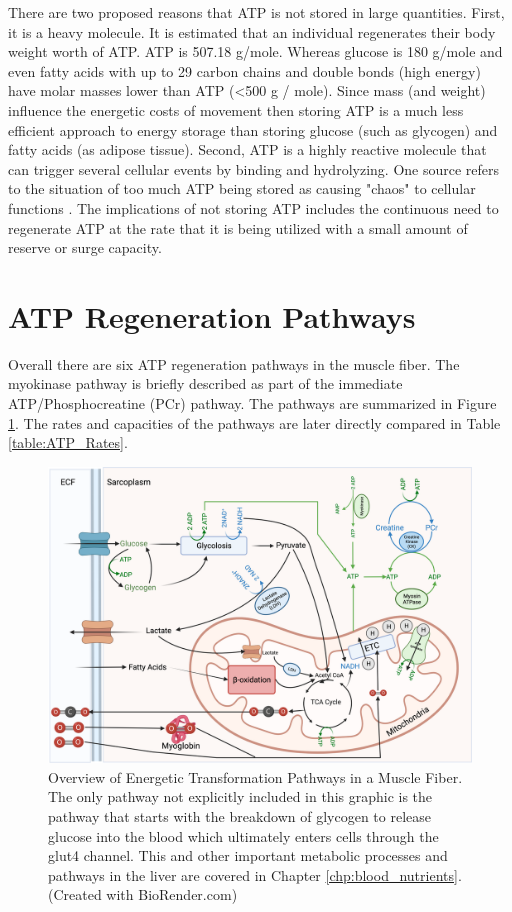 There are two proposed reasons that ATP is not stored in large quantities. First, it is a heavy molecule. It is estimated that an individual regenerates their body weight worth of ATP. ATP is 507.18 g/mole. Whereas glucose is 180 g/mole and even fatty acids with up to 29 carbon chains and double bonds (high energy) have molar masses lower than ATP (<500 g / mole). Since mass (and weight) influence the energetic costs of movement then storing ATP is a much less efficient approach to energy storage than storing glucose (such as glycogen) and fatty acids (as adipose tissue). Second, ATP is a highly reactive molecule that can trigger several cellular events by binding and hydrolyzing. One source refers to the situation of too much ATP being stored as causing "chaos" to cellular functions \cite{jones_skeletal_2006}. The implications of not storing ATP includes the continuous need to regenerate ATP at the rate that it is being utilized with a small amount of reserve or surge capacity.



\section{ATP Regeneration Pathways}

Overall there are six ATP regeneration pathways in the muscle fiber. The myokinase pathway is briefly described as part of the immediate ATP/Phosphocreatine (PCr) pathway. The pathways are summarized in Figure \ref{fig:Energetics_Overview}. The rates and capacities of the pathways are later directly compared in Table \ref{table:ATP_Rates}. 


\begin{figure}[!h]
    \centering
    \includegraphics[width=1\linewidth]{./figure/Energetics_Overview.png}
    \caption{Overview of Energetic Transformation Pathways in a Muscle Fiber. The only pathway not explicitly included in this graphic is the pathway that starts with the breakdown of glycogen to release glucose into the blood which ultimately enters cells through the glut4 channel. This and other important metabolic processes and pathways in the liver are covered in Chapter \ref{chp:blood_nutrients}. (\footnotesize{Created with BioRender.com})}
    \label{fig:Energetics_Overview}
\end{figure}

